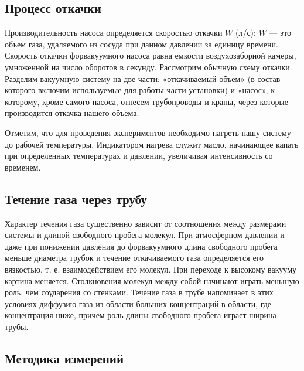 \documentclass[12pt,a4paper]{article}
\begin{document}
\subsection*{Процесс откачки}
	Производительность насоса определяется скоростью откачки $W$ (л/с): $W$ — это объем газа, удаляемого из сосуда при данном давлении за единицу времени. Скорость откачки форвакуумного насоса равна емкости воздухозаборной камеры, умноженной на число оборотов в секунду.
Рассмотрим обычную схему откачки. Разделим вакуумную систему на две части: «откачиваемый объем» (в состав которого включим используемые для работы части установки) и «насос», к которому, кроме самого насоса, отнесем трубопроводы и краны, через которые производится откачка нашего объема. 

	Отметим, что для проведения экспериментов необходимо нагреть нашу систему до рабочей температуры. Индикатором нагрева служит масло, начинающее капать при определенных температурах и давлении, увеличивая интенсивность со временем.

\subsection*{Течение газа через трубу}
	Характер течения газа существенно зависит от соотношения между размерами системы и длиной свободного пробега молекул. При атмосферном давлении и даже при понижении давления до форвакуумного длина свободного пробега меньше диаметра трубок и течение откачиваемого газа определяется его вязкостью, т. е. взаимодействием его молекул. При переходе к высокому вакууму картина меняется. Столкновения молекул между собой начинают играть меньшую роль, чем соударения со стенками. Течение газа в трубе напоминает в этих условиях диффузию газа из области больших концентраций в области, где концентрация ниже, причем роль длины свободного пробега играет ширина трубы.
	
	
\subsection{Методика измерений}
\end{document}
